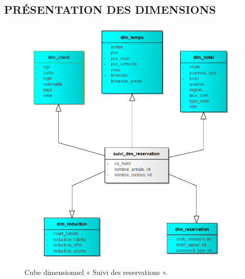 \cleardoublepage
\subsection{PRÉSENTATION DES DIMENSIONS}
\begin{figure}[!htbp]
	\begin{center}
		\includegraphics[scale=0.85]{images/cube_reservation.png}
		\caption{Cube dimensionnel « Suivi des reservations ».}
		\label{use_bi_tools}
	\end{center}
\end{figure}

